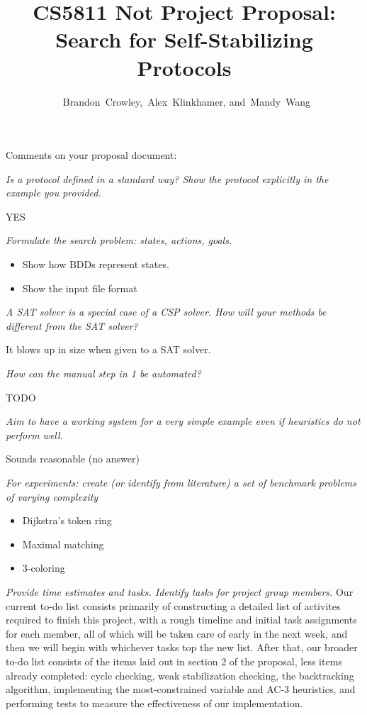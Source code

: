 


\usepackage{tikz}
\usetikzlibrary{arrows}


\title{
 CS5811 Not Project Proposal:\\
 Search for Self-Stabilizing Protocols
}

\author{~Brandon~Crowley,~Alex~Klinkhamer, and~Mandy~Wang}
\maketitle



Comments on your proposal document:

{\it Is a protocol defined in a standard way? Show the protocol explicitly in the example you provided.}

YES

{\it Formulate the search problem: states, actions, goals.
\begin{itemize}
\item Show how BDDs represent states.
\item Show the input file format
\end{itemize}
}

{\it A SAT solver is a special case of a CSP solver. How will your methods be different from the SAT solver?}

It blows up in size when given to a SAT solver.

{\it How can the manual step in 1 be automated?}

TODO

{\it Aim to have a working system for a very simple example even if heuristics do not perform well.}

Sounds reasonable (no answer)

{\it For experiments: create (or identify from literature) a set of benchmark problems of varying complexity}

\begin{itemize}
\item Dijkstra's token ring
\item Maximal matching
\item 3-coloring
\end{itemize}

{\it Provide time estimates and tasks. Identify tasks for project group members.}
Our current to-do list consists primarily of constructing a detailed list of activites required to finish this project, with a rough timeline 
and initial task assignments for each member, all of which will be taken care of early in the next week, and then we will begin with whichever tasks top
the new list.  After that, our broader to-do list consists of the items laid out in section 2 of the proposal, less items already completed:
cycle checking, weak stabilization checking, the backtracking algorithm, implementing the most-constrained variable and AC-3 heuristics, and performing
tests to measure the effectiveness of our implementation.




